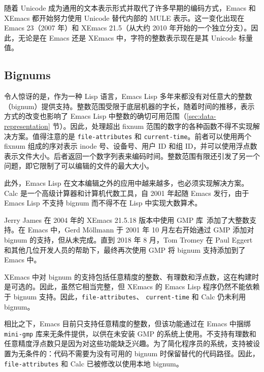 \documentclass[format=acmsmall,screen]{acmart}
\begin{document}
随着 Unicode 成为通用的文本表示形式并取代了许多早期的编码方式，Emacs 和 XEmacs 都开始努力使用 Unicode 替代内部的 MULE 表示。这一变化出现在 Emacs 23（2007 年）和 XEmacs 21.5（从大约 2010 年开始的一个独立分支）。因此，无论是在 Emacs 还是 XEmacs 中，字符的整数表示现在是其 Unicode 标量值。


\subsection{Bignums}

令人惊讶的是，作为一种 Lisp 语言，Emacs Lisp 多年来都没有对任意大的整数（bignum）提供支持。整数范围受限于底层机器的字长，随着时间的推移，表示方式的改变也影响了 Emacs Lisp 中整数的确切可用范围（\ref{sec:data-representation} 节）。因此，处理超出 fixnum 范围的数字的各种函数不得不实现解决方案。值得注意的是 \texttt{file-attributes} 和 \texttt{current-time}。前者可以使用两个 fixnum 组成的序对表示 inode 号、设备号、用户 ID 和组 ID，并可以使用浮点数表示文件大小。后者返回一个数字列表来编码时间。整数范围有限还引发了另一个问题，即它限制了可以编辑的文件的最大大小。

此外，Emacs Lisp 在文本编辑之外的应用中越来越多，也必须实现解决方案。Calc 是一个高级计算器和计算机代数工具，自 2001 年起随 Emacs 发行，由于 Emacs Lisp 不支持 bignum 而不得不在 Lisp 中实现大数算术。

Jerry James 在 2004 年的 XEmacs 21.5.18 版本中使用 GMP 库~\cite{GMP}添加了大整数支持。在 Emacs 中，Gerd Möllmann 于 2001 年 10 月左右开始通过 GMP 添加对 bignum 的支持，但从未完成。直到 2018 年 8 月，Tom Tromey 在 Paul Eggert 和其他几位开发人员的帮助下，最终再次使用 GMP 将 bignum 支持添加到了 Emacs 中。

XEmacs 中对 bignum 的支持包括任意精度的整数、有理数和浮点数，这在构建时是可选的。因此，虽然它相当完整，但 XEmacs 的 Emacs Lisp 程序仍然不能依赖于 bignum 支持。因此，\texttt{file-attributes}、 \texttt{current-time} 和 Calc 仍未利用 bignum。

相比之下，Emacs 目前只支持任意精度的整数，但该功能通过在 Emacs 中捆绑 \texttt{mini-gmp} 库来无条件提供，以供在未安装 GMP 的系统上使用。不支持有理数和任意精度浮点数只是因为对这些功能缺乏兴趣。为了简化程序员的系统，支持被设置为无条件的：代码不需要为没有可用的 bignum 时保留替代的代码路径。因此， \texttt{file-attributes} 和 Calc 已被修改以使用本地 bignum。
\end{document}
